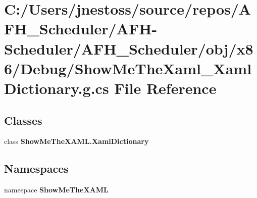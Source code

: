 \section{C\+:/\+Users/jnestoss/source/repos/\+A\+F\+H\+\_\+\+Scheduler/\+A\+F\+H-\/\+Scheduler/\+A\+F\+H\+\_\+\+Scheduler/obj/x86/\+Debug/\+Show\+Me\+The\+Xaml\+\_\+\+Xaml\+Dictionary.g.\+cs File Reference}
\label{x86_2_debug_2_show_me_the_xaml___xaml_dictionary_8g_8cs}
\subsection*{Classes}
\begin{DoxyCompactItemize}
\item 
class {\bfseries Show\+Me\+The\+X\+A\+M\+L.\+Xaml\+Dictionary}
\end{DoxyCompactItemize}
\subsection*{Namespaces}
\begin{DoxyCompactItemize}
\item 
namespace \textbf{ Show\+Me\+The\+X\+A\+ML}
\end{DoxyCompactItemize}
